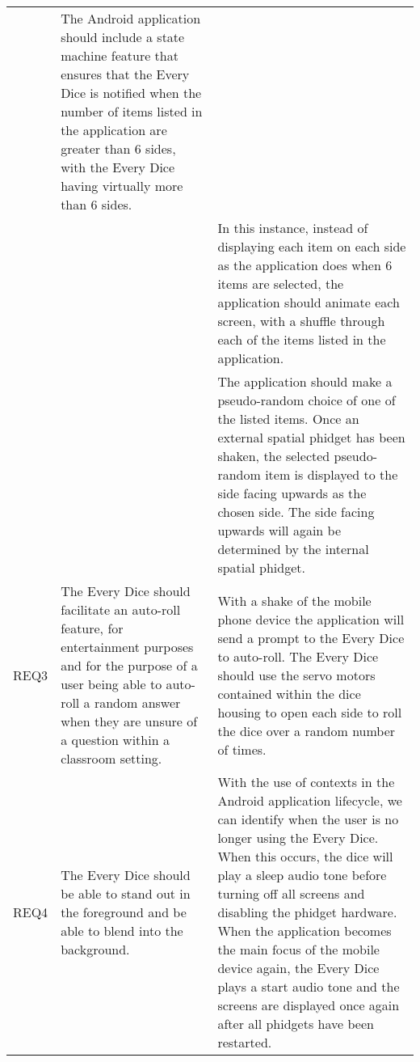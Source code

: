 \begin{xltabular}[H]{\textwidth}{c | X | X}
    &

    The Android application should include a state machine feature that ensures that the Every Dice is notified when the number of items listed in the application are greater than 6 sides, with the Every Dice having virtually more than 6 sides.\\


    &

    &

    In this instance, instead of displaying each item on each side as the application does when 6 items are selected, the application should animate each screen, with a shuffle through each of the items listed in the application.\\


    &

    &

    The application should make a pseudo-random choice of one of the listed items. Once an external spatial phidget has been shaken, the selected pseudo-random item is displayed to the side facing upwards as the chosen side. The side facing upwards will again be determined by the internal spatial phidget.\\

    \midrule

    REQ3

    &

    The Every Dice should facilitate an auto-roll feature, for entertainment purposes and for the purpose of a user being able to auto-roll a random answer when they are unsure of a question within a classroom setting.

    &

    With a shake of the mobile phone device the application will send a prompt to the Every Dice to auto-roll. The Every Dice should use the servo motors contained within the dice housing to open each side to roll the dice over a random number of times.\\

    \midrule

    REQ4

    &

    The Every Dice should be able to stand out in the foreground and be able to blend into the background.

    &

    With the use of contexts in the Android application lifecycle, we can identify when the user is no longer using the Every Dice. When this occurs, the dice will play a sleep audio tone before turning off all screens and disabling the phidget hardware. When the application becomes the main focus of the mobile device again, the Every Dice plays a start audio tone and the screens are displayed once again after all phidgets have been restarted.\\

\end{xltabular}
\label{tbl:func_reqs_table}
